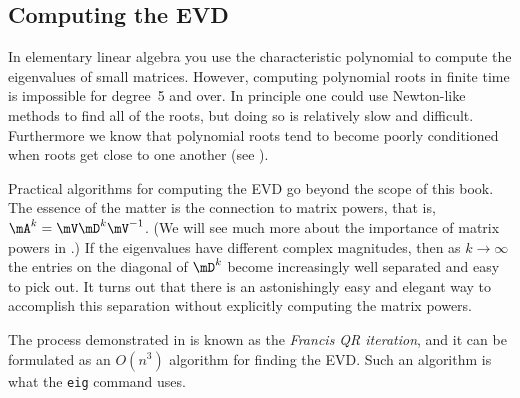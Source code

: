 \begin{exam*}
\end{exam*}

\subsection{Computing the EVD}

In elementary linear algebra you use the characteristic polynomial to compute the eigenvalues of small matrices. However, computing polynomial roots in finite time is impossible for degree~5 and over. In principle one could use Newton-like methods to find all of the roots, but doing so is relatively slow and difficult. Furthermore we know that polynomial roots tend to become poorly conditioned when roots get close to one another (see ).

Practical algorithms for computing the EVD go beyond the scope of this book. The essence of the matter is the connection to matrix powers, that is, $\mA^k = \mV \mD^k \mV^{-1}$. (We will see much more about the importance of matrix powers in .) If the eigenvalues have different complex magnitudes, then as $k\to\infty$ the entries on the diagonal of $\mD^k$ become increasingly well separated and easy to pick out. It turns out that there is an astonishingly easy and elegant way to accomplish this separation without explicitly computing the matrix powers.

\begin{exam}
\end{exam}

The process demonstrated in  is known as the  \textit{Francis QR iteration}, and it can be formulated as an $O(n^3)$ algorithm for finding the EVD. Such an algorithm is what the \texttt{eig} command uses.






